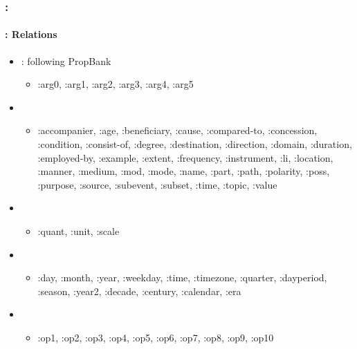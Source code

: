 \documentclass[xcolor=table]{beamer}
\begin{document}
\begin{frame}[fragile]
	\frametitle{\insertshortsubtitle: \insertsection}
	\framesubtitle{\insertsubsection: Relations}
	
	\begin{itemize}
		\item {}: following PropBank
		\begin{itemize}
			\item :arg0, :arg1, :arg2, :arg3, :arg4, :arg5
		\end{itemize}
		\item {}
		\begin{itemize}
			\item :accompanier, :age, :beneficiary, :cause, :compared-to, :concession, :condition, :consist-of, :degree, :destination, :direction, :domain, :duration, :employed-by, :example, :extent, :frequency, :instrument, :li, :location, :manner, :medium, :mod, :mode, :name, :part, :path, :polarity, :poss, :purpose, :source, :subevent, :subset, :time, :topic, :value
		\end{itemize}
		\item {}
		\begin{itemize}
			\item :quant, :unit, :scale
		\end{itemize}
		\item {}
		\begin{itemize}
			\item :day, :month,
			:year, :weekday, :time, :timezone, :quarter,
			:dayperiod, :season, :year2, :decade, :century,
			:calendar, :era
		\end{itemize}
		\item {}
		\begin{itemize}
			\item :op1, :op2, :op3, :op4, :op5,
			:op6, :op7, :op8, :op9, :op10
		\end{itemize}
	\end{itemize}
	
\end{frame}
\end{document}
